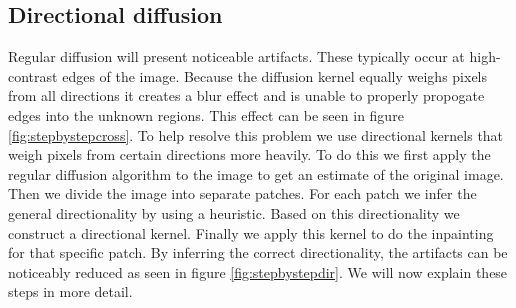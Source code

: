 \subsection{Directional diffusion}

Regular diffusion will present noticeable artifacts. These typically occur at high-contrast edges of the image. Because the diffusion kernel equally weighs pixels from all directions it creates a blur effect and is unable to properly propogate edges into the unknown regions. This effect can be seen in figure \ref{fig:stepbystepcross}. To help resolve this problem we use directional kernels that weigh pixels from certain directions more heavily. To do this we first apply the regular diffusion algorithm to the image to get an estimate of the original image. Then we divide the image into separate patches. For each patch we infer the general directionality by using a heuristic. Based on this directionality we construct a directional kernel. Finally we apply this kernel to do the inpainting for that specific patch. By inferring the correct directionality, the artifacts can be noticeably reduced as seen in figure \ref{fig:stepbystepdir}. We will now explain these steps in more detail.

